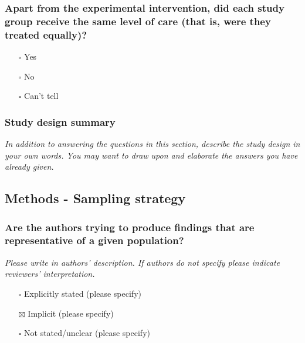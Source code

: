 \documentclass[
  doc, a4paper]{apa7}
\providecommand{\tightlist}{%
  \setlength{\itemsep}{0pt}\setlength{\parskip}{0pt}}
\begin{document}
\subsubsection{Apart from the experimental intervention, did each study group receive the same level of care (that is, were they treated equally)?}\label{apart-from-the-experimental-intervention-did-each-study-group-receive-the-same-level-of-care-that-is-were-they-treated-equally}

\begin{itemize}
\tightlist
\item[$\square$]
  Yes
\item[$\square$]
  No
\item[$\square$]
  Can't tell
\end{itemize}

\subsubsection{Study design summary}\label{study-design-summary}

\emph{In addition to answering the questions in this section, describe the study design in your own words. You may want to draw upon and elaborate the answers you have already given.}

\subsection{Methods - Sampling strategy}\label{methods---sampling-strategy}

\subsubsection{Are the authors trying to produce findings that are representative of a given population?}\label{are-the-authors-trying-to-produce-findings-that-are-representative-of-a-given-population}

\emph{Please write in authors' description. If authors do not specify please indicate reviewers' interpretation.}

\begin{itemize}
\tightlist
\item[$\square$]
  Explicitly stated (please specify)
\item[$\boxtimes$]
  Implicit (please specify)
\item[$\square$]
  Not stated/unclear (please specify)
\end{itemize}
\end{document}
